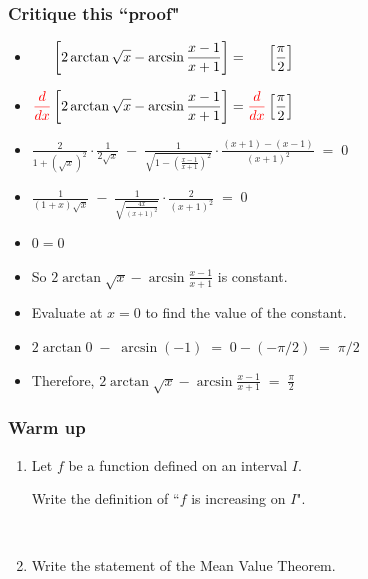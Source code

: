 \documentclass[14pt]{beamer}
\newcommand {\DS} [1] {${\displaystyle #1}$}
\newcommand{\rojo}[1]{{\color{red} #1}}
\newcommand{\setsize}[1]{\fontsize{#1}{#1}\selectfont} %
\begin{document}
\begin{frame}[t]
\setsize{12}
\frametitle{Critique this ``proof"}
\begin{itemize}
	\item  \DS{ \phantom{\rojo{\frac{d}{dx}}} \left[  2 \arctan \sqrt{x} -  \arcsin \frac{x-1}{x+1} \right] =  \phantom{\rojo{\frac{d}{dx}}} \left[ \frac{\pi}{2} \right] }
	\item  \DS{ \rojo{\frac{d}{dx}} \left[  2 \arctan \sqrt{x} -  \arcsin \frac{x-1}{x+1} \right] =  \rojo{\frac{d}{dx}} \left[ \frac{\pi}{2} \right] }
	\item  \DS{\frac{2}{1+ \left( \sqrt{x} \right)^2} \cdot \frac{1}{2\sqrt{x}}  \; - \;  \frac{1}{\sqrt{1- \left( \frac{x-1}{x+1} \right)^2}} \cdot \frac{(x+1) - (x-1)}{(x+1)^2} \; = \; 0}
	\item  \DS{\frac{1}{(1+ x)\sqrt{x} }   \; - \;  \frac{1}{  \sqrt{\frac{4x}{(x+1)^2} }} \cdot \frac{2}{(x+1)^2} \; = \; 0}
	\item \DS{0 = 0}
		\item  So \DS{  2 \arctan \sqrt{x} - \arcsin \frac{x-1}{x+1} } is constant.
		\item Evaluate at $x=0$ to find the value of the constant.
		\item \DS{2 \arctan 0 \; - \; \arcsin (-1) \; = \; 0 - \left( - \pi/2 \right) \; = \; \pi/2 }
		\item Therefore, \; \DS{2 \arctan \sqrt{x} - \arcsin \frac{x-1}{x+1} \; = \;  \frac{\pi}{2}}
\end{itemize}



\end{frame}
\begin{frame}[t]
\frametitle{Warm up}

\begin{enumerate}

	\item Let $f$ be a function defined on an interval $I$.
	
	Write the definition of ``$f$ is increasing on $I$".
	
	\
	
	\item Write the statement of the Mean Value Theorem.
\end{enumerate}
\end{frame}
\end{document}
